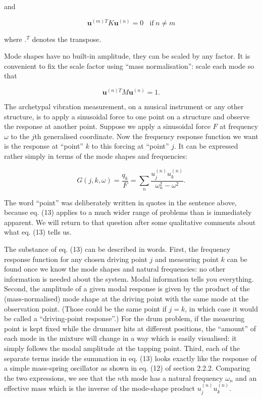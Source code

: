   and 

  $$ \mathbf{u}^{(m)T} K \mathbf{u}^{(n)} = 0 \mathrm{~~~~if~} n \ne m 
  \tag{11}$$ 

  where $.^T$ denotes the transpose. 

  Mode shapes have no built-in amplitude, they can be scaled by any factor. It 
  is convenient to fix the scale factor using ``mass normalisation'': scale 
  each mode so that 

  $$\mathbf{u}^{(n)T} M \mathbf{u}^{(n)}=1 . \tag{12}$$ 

  The archetypal vibration measurement, on a musical instrument or any other 
  structure, is to apply a sinusoidal force to one point on a structure and 
  observe the response at another point. Suppose we apply a sinusoidal force 
  $F$ at frequency $\omega$ to the $j$th generalised coordinate. Now the 
  frequency response function we want is the response at ``point'' $k$ to this 
  forcing at ``point'' $j$. It can be expressed rather simply in terms of the 
  mode shapes and frequencies: 

  $$G(j,k,\omega)=\dfrac{q_k}{F}=\sum_n 
  \dfrac{u_j^{(n)}u_k^{(n)}}{\omega_n^2-\omega^2}. \tag{13}$$ 

  The word ``point'' was deliberately written in quotes in the sentence above, 
  because eq. (13) applies to a much wider range of problems than is 
  immediately apparent. We will return to that question after some qualitative 
  comments about what eq. (13) tells us. 

  The substance of eq. (13) can be described in words. First, the frequency 
  response function for any chosen driving point $j$ and measuring point $k$ 
  can be found once we know the mode shapes and natural frequencies: no other 
  information is needed about the system. Modal information tells you 
  everything. Second, the amplitude of a given modal response is given by the 
  product of the (mass-normalised) mode shape at the driving point with the 
  same mode at the observation point. (Those could be the same point if $j = 
  k$, in which case it would be called a ``driving-point response''.) For the 
  drum problem, if the measuring point is kept fixed while the drummer hits at 
  different positions, the ``amount'' of each mode in the mixture will change 
  in a way which is easily visualised: it simply follows the modal amplitude at 
  the tapping point. Third, each of the separate terms inside the summation in 
  eq. (13) looks exactly like the response of a simple mass-spring oscillator 
  as shown in eq. (12) of section 2.2.2. Comparing the two expressions, we see 
  that the $n$th mode has a natural frequency $\omega_n$ and an effective mass 
  which is the inverse of the mode-shape product $u_j^{(n)}u_k^{(n)}$. 

